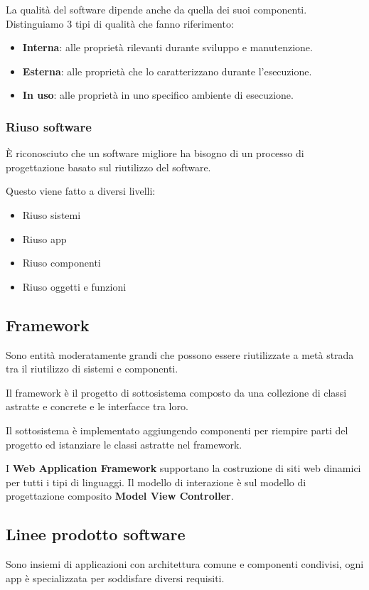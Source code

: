 \documentclass{report}
\begin{document}
\newpage
\noindent
La qualità del software dipende anche da quella dei suoi componenti. Distinguiamo 3 tipi di qualità che fanno riferimento:
\begin{itemize}
    \item \textbf{Interna}: alle proprietà rilevanti durante sviluppo e manutenzione.
    \item \textbf{Esterna}: alle proprietà che lo caratterizzano durante l'esecuzione.
    \item \textbf{In uso}: alle proprietà in uno specifico ambiente di esecuzione.
\end{itemize}

\subsubsection*{Riuso software}
\`E riconosciuto che un software migliore ha bisogno di un processo di progettazione basato sul riutilizzo del software.

\noindent
Questo viene fatto a diversi livelli:
\begin{itemize}
    \item Riuso sistemi
    \item Riuso app
    \item Riuso componenti
    \item Riuso oggetti e funzioni
\end{itemize}

\subsection*{Framework}
Sono entità moderatamente grandi che possono essere riutilizzate a metà strada tra il riutilizzo di sistemi e componenti.

\smallskip
\noindent
Il framework è il progetto di sottosistema composto da una collezione di classi astratte e concrete e le interfacce tra loro.

\noindent
Il sottosistema è implementato aggiungendo componenti per riempire parti del progetto ed istanziare le classi astratte nel framework.

\smallskip
\noindent
I \textbf{Web Application Framework} supportano la costruzione di siti web dinamici per tutti i tipi di linguaggi. Il modello di interazione è sul modello di progettazione composito \textbf{Model View Controller}.

\subsection*{Linee prodotto software}
Sono insiemi di applicazioni con architettura comune e componenti condivisi, ogni app è specializzata per soddisfare diversi requisiti.
\end{document}
